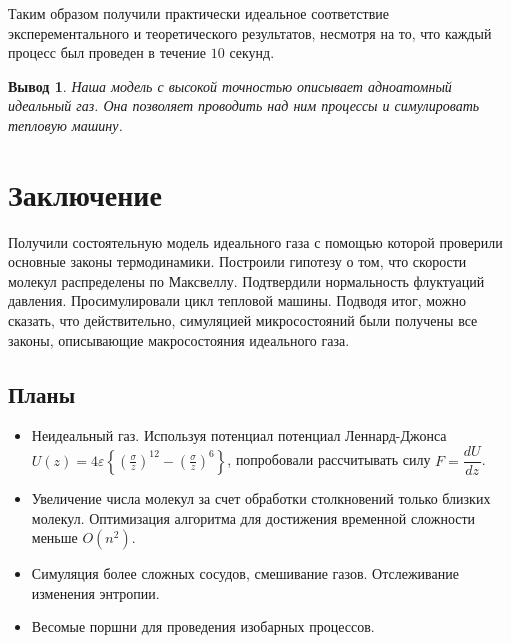 \documentclass[twoside,twocolumn, 11pt]{article}
\theoremstyle{plain}
\newtheorem{conclusion}{Вывод}
\theoremstyle{definition}
\begin{document}
Таким образом получили практически идеальное соответствие эксперементального и теоретического результатов, несмотря на то, что
каждый процесс был проведен в течение $10$ секунд.

\begin{conclusion}
Наша модель с высокой точностью описывает адноатомный идеальный газ. Она позволяет проводить над ним процессы и симулировать тепловую машину.
\end{conclusion}

\section{Заключение}
\indent Получили состоятельную модель идеального газа с помощью которой проверили основные законы термодинамики. Построили гипотезу о том,
что скорости молекул распределены по Максвеллу. Подтвердили нормальность флуктуаций давления. Просимулировали цикл тепловой машины.
Подводя итог, можно сказать, что действительно, симуляцией микросостояний были получены все законы, описывающие макросостояния идеального газа.

\subsection{Планы}
\begin{itemize}
\item Неидеальный газ.
Используя потенциал потенциал Леннард-Джонса $ U(z)=4 \varepsilon\left\{\left(\frac{\sigma}{z}\right)^{12}-\left(\frac{\sigma}{z}\right)^{6}\right\}$, попробовали
рассчитывать силу $F = \dfrac{dU}{dz}$.
\item Увеличение числа молекул за счет обработки столкновений только близких молекул. Оптимизация алгоритма для достижения временной сложности меньше $O(n^2)$.
\item Симуляция более сложных сосудов, смешивание газов. Отслеживание изменения энтропии.
\item Весомые поршни для проведения изобарных процессов.
\end{itemize}

\end{document}
